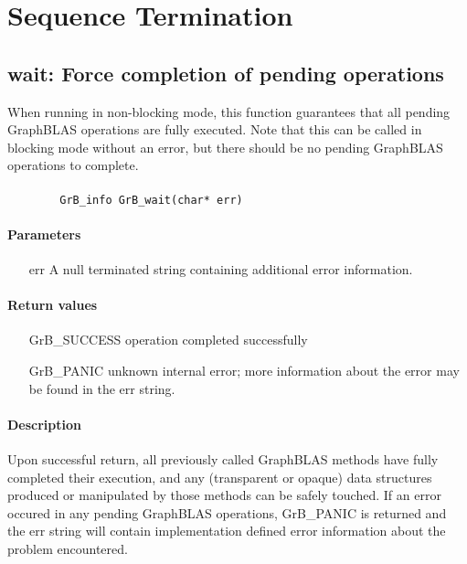 \section{Sequence Termination}

\subsection{{\sf wait}: Force completion of pending operations}
\label{Sec:wait}

When running in non-blocking mode, this function guarantees that all pending GraphBLAS operations are fully executed.  Note that this can be called in blocking mode without an error, but there should be no pending GraphBLAS operations to complete.

\paragraph{\syntax}

\begin{verbatim}
        GrB_info GrB_wait(char* err)
\end{verbatim}

\paragraph{Parameters}
\begin{itemize}[leftmargin=1.1in]
\item[{\sf err}]     A null terminated string containing additional error
information.
\end{itemize}


\paragraph{Return values}
\begin{itemize}[leftmargin=2.1in]
\item[{\sf GrB\_SUCCESS}]	operation completed successfully
\item[{\sf GrB\_PANIC}]		unknown internal error; more information about the error may be found in the {\sf err} string.
\end{itemize}

\paragraph{Description}

Upon successful return, all previously called GraphBLAS methods have fully completed their execution, and 
any (transparent or opaque) data structures produced or manipulated by those methods can be safely touched.  If an error occured in any pending GraphBLAS operations, {\sf GrB\_PANIC} is returned and the {\sf err} string will contain implementation defined error information about the problem encountered.

